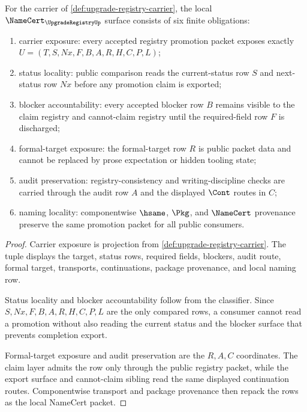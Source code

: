 \begin{theorem}
\label{thm:upgrade-registry-namecert-obligations}
For the carrier of \autoref{def:upgrade-registry-carrier}, the local $\NameCert_{\UpgradeRegistryUp}$ surface consists of six finite obligations:
\begin{enumerate}
\item carrier exposure: every accepted registry promotion packet exposes exactly $U=(T,S,Nx,F,B,A,R,H,C,P,L)$;
\item status locality: public comparison reads the current-status row $S$ and next-status row $Nx$ before any promotion claim is exported;
\item blocker accountability: every accepted blocker row $B$ remains visible to the claim registry and cannot-claim registry until the required-field row $F$ is discharged;
\item formal-target exposure: the formal-target row $R$ is public packet data and cannot be replaced by prose expectation or hidden tooling state;
\item audit preservation: registry-consistency and writing-discipline checks are carried through the audit row $A$ and the displayed $\Cont$ routes in $C$;
\item naming locality: componentwise $\hsame$, $\Pkg$, and $\NameCert$ provenance preserve the same promotion packet for all public consumers.
\end{enumerate}
\end{theorem}
\begin{proof}
Carrier exposure is projection from \autoref{def:upgrade-registry-carrier}. The tuple displays the target, status rows, required fields, blockers, audit route, formal target, transports, continuations, package provenance, and local naming row.

Status locality and blocker accountability follow from the classifier. Since $S,Nx,F,B,A,R,H,C,P,L$ are the only compared rows, a consumer cannot read a promotion without also reading the current status and the blocker surface that prevents completion export.

Formal-target exposure and audit preservation are the $R,A,C$ coordinates. The claim layer admits the row only through the public registry packet, while the export surface and cannot-claim sibling read the same displayed continuation routes. Componentwise transport and package provenance then repack the rows as the local NameCert packet.
\end{proof}

